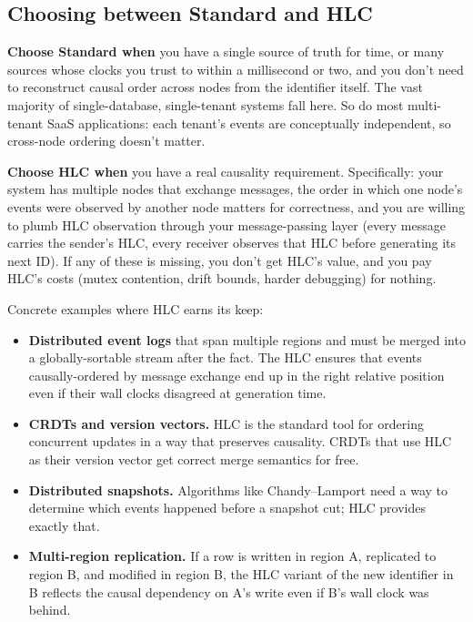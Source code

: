 \subsection{Choosing between Standard and HLC}

\textbf{Choose Standard when} you have a single source of truth for time, or many sources whose clocks you trust to within a millisecond or two, and you don't need to reconstruct causal order across nodes from the identifier itself. The vast majority of single-database, single-tenant systems fall here. So do most multi-tenant SaaS applications: each tenant's events are conceptually independent, so cross-node ordering doesn't matter.

\textbf{Choose HLC when} you have a real causality requirement. Specifically: your system has multiple nodes that exchange messages, the order in which one node's events were observed by another node matters for correctness, and you are willing to plumb HLC observation through your message-passing layer (every message carries the sender's HLC, every receiver observes that HLC before generating its next ID). If any of these is missing, you don't get HLC's value, and you pay HLC's costs (mutex contention, drift bounds, harder debugging) for nothing.

Concrete examples where HLC earns its keep:

\begin{itemize}
  \item \textbf{Distributed event logs} that span multiple regions and must be merged into a globally-sortable stream after the fact. The HLC ensures that events causally-ordered by message exchange end up in the right relative position even if their wall clocks disagreed at generation time.
  \item \textbf{CRDTs and version vectors.} HLC is the standard tool for ordering concurrent updates in a way that preserves causality. CRDTs that use HLC as their version vector get correct merge semantics for free.
  \item \textbf{Distributed snapshots.} Algorithms like Chandy--Lamport \citep{chandylamport1985} need a way to determine which events happened before a snapshot cut; HLC provides exactly that.
  \item \textbf{Multi-region replication.} If a row is written in region A, replicated to region B, and modified in region B, the HLC variant of the new identifier in B reflects the causal dependency on A's write even if B's wall clock was behind.
\end{itemize}

